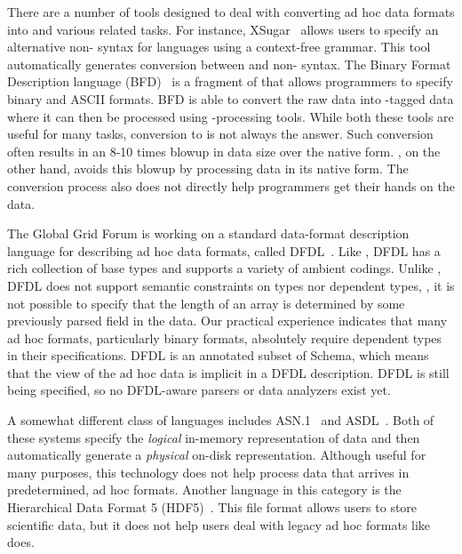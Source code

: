 There are a number of tools designed to deal with converting ad hoc
data formats into \xml{} and various related tasks.  For instance,
XSugar~\cite{brabrand+:xsugar2005} allows users to specify an
alternative non-\xml{} syntax for \xml{} languages using a context-free
grammar.  This tool automatically generates conversion between \xml{} and
non-\xml{} syntax.  The Binary Format Description language 
(BFD)~\cite{bfd} is a fragment of
\xml{} that allows programmers to specify binary and ASCII formats.  BFD
is able to convert the raw data into \xml{}-tagged data where it can then be
processed using \xml{}-processing tools.    While both these tools are 
useful for many
tasks, conversion to \xml{} is not always the answer.  Such conversion
often results in an 8-10 times blowup in data size over the native form.
\padsml{}, on the other hand, avoids this blowup by processing data in its 
native form.  The conversion process also does not directly help programmers
get their hands on the data.

The Global Grid Forum is working on a standard
data-format description language for describing ad hoc data formats,
called DFDL~\cite{dfdl-proposal,dfdl-primer}.  Like \padsml{},
DFDL{} has a rich collection of base types and supports a variety of
ambient codings.  Unlike \padsml{}, DFDL{} does not support semantic
constraints on types nor dependent types, \eg{}, it is not possible to
specify that the length of an array is determined by some previously parsed field in the
data.  Our practical experience indicates that many ad hoc formats,
particularly binary formats, absolutely require dependent types in their
specifications.  DFDL{} is an annotated subset of \xml{}{} Schema, which means
that the \xml{}{} view of the ad hoc data is implicit in a DFDL{}
description.  DFDL{} is still being specified, so no DFDL-aware
parsers or data analyzers exist yet.  


A somewhat different class of languages includes
\textsc{ASN.1}~\cite{asn} and \textsc{ASDL}~\cite{asdl}.  Both of
these systems specify the {\em logical\/} in-memory representation of
data and then automatically generate a {\em physical\/} on-disk
representation.  Although useful for many purposes, this technology
does not help process data that arrives in predetermined, ad hoc
formats.  Another language in this category is the Hierarchical Data
Format 5 (HDF5)~\cite{hdf5}.  This file format allows users to store
scientific data, but it does not help users deal with legacy ad hoc
formats like \padsml{} does.

